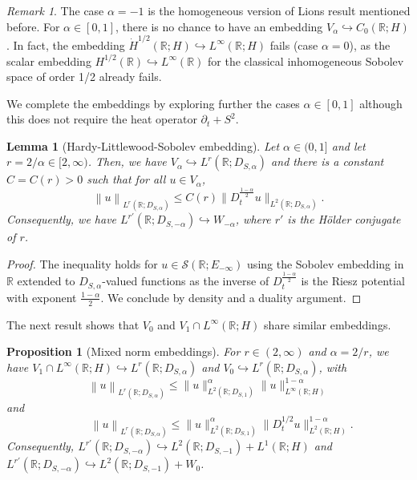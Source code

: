 \documentclass[11pt, letterpaper]{amsart}
\newtheorem{prop}[thm]{Proposition}
\newtheorem{lem}[thm]{Lemma}
\theoremstyle{definition}
\theoremstyle{remark}
\newtheorem{rem}[thm]{Remark}
\numberwithin{equation}{section}
\begin{document}
 {
\begin{rem} The case $\alpha=-1$ is the homogeneous version of Lions result mentioned before.
For $\alpha \in [0,1]$, there is no chance to have an embedding $V_\alpha \hookrightarrow C_0(\mathbb{R};H)$. In fact, the embedding $\dot{H}^{1/2}(\mathbb{R};H) \hookrightarrow L^\infty(\mathbb{R};H)$ fails (case $\alpha=0$), as the scalar embedding ${H}^{1/2}(\mathbb{R}) \hookrightarrow L^\infty(\mathbb{R})$ for the classical inhomogeneous Sobolev space of order 1/2 already fails. 
\end{rem}
We complete the embeddings by exploring further the cases $\alpha \in [0,1]$ although this does not require the heat operator $\partial_t + S^2$.
\begin{lem}[Hardy-Littlewood-Sobolev embedding]\label{Hardy-Littlewood-Sobolev}
    Let $\alpha \in (0,1]$ and let $r={2}/{\alpha} \in [2,\infty)$. Then,  we have $V_{\alpha} \hookrightarrow L^{r}(\mathbb{R};D_{S,\alpha}) $ and there is a constant $C=C(r)>0$ such that for all $u \in V_{\alpha}$,  \begin{equation*} 
     \left\| u \right\|_{L^r(\mathbb{R};D_{S,\alpha})} \leq C(r) \|D_t^{\frac{1-\alpha}{2}}u \|_{L^2(\mathbb{R};D_{S,\alpha})}.\end{equation*}
    Consequently, we have $ L^{r'}(\mathbb{R};D_{S,-\alpha}) \hookrightarrow W_{-\alpha}$, where  $r'$ is the H\"older conjugate of $r$. 
\end{lem}
\begin{proof} The inequality holds for $u \in \mathcal{S}(\mathbb{R};E_{-\infty})$ using the  Sobolev embedding in $\mathbb{R}$ extended to $D_{S,\alpha}$-valued functions as the inverse of $D_t^{\frac{1-\alpha}{2}}$ is the Riesz potential with exponent $\frac{1-\alpha}{2}$.
    We conclude by density and a duality argument.
\end{proof}

The next result shows that $V_0$ and $V_1\cap L^{\infty}(\mathbb{R}; H)$ share similar embeddings.

\begin{prop}[Mixed norm embeddings]\label{prop:embed r>0} For $r\in (2,\infty)$ and $\alpha= 2/ r$, we have $V_1\cap L^{\infty}(\mathbb{R}; H)\hookrightarrow L^{r}(\mathbb{R};D_{S,\alpha})$ and $V_{0} \hookrightarrow L^{r}(\mathbb{R};D_{S,\alpha}) $,  
with 
$$   \left\| u \right\|_{L^r(\mathbb{R};D_{S,\alpha})} \leq \|u \|_{L^2(\mathbb{R};D_{S,1})}^\alpha \|u \|_{L^\infty(\mathbb{R};H)}^{1-\alpha}$$
and
 $$  \hspace{1cm} \left\| u \right\|_{L^r(\mathbb{R};D_{S,\alpha})} \leq  \|u \|_{L^2(\mathbb{R};D_{S,1})}^\alpha \|D_t^{{1}/{2}}u \|_{L^2(\mathbb{R};H)}^{1-\alpha}.$$
    Consequently, $L^{r'}(\mathbb{R};D_{S,-\alpha}) \hookrightarrow L^2(\mathbb{R}; D_{S,-1}) + L^1(\mathbb{R};H)$ and $L^{r'}(\mathbb{R};D_{S,-\alpha}) \hookrightarrow L^2(\mathbb{R}; D_{S,-1}) + W_0$.
\end{prop}

}
\end{document}
